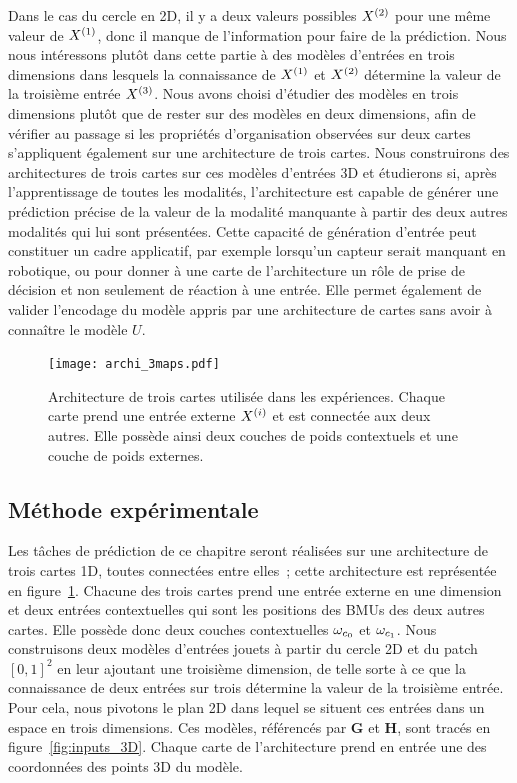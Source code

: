\documentclass[../main]{subfiles}
\begin{document}
Dans le cas du cercle en 2D, il y a deux valeurs possibles $X^{({2})}$ pour une même valeur de $X^{({1})}$, donc il manque de l'information pour faire de la prédiction.
Nous nous intéressons plutôt dans cette partie à des modèles d'entrées en trois dimensions dans lesquels la connaissance de $X^{({1})}$ et $X^{({2})}$ détermine la valeur de la troisième entrée $X^{({3})}$.
Nous avons choisi d'étudier des modèles en trois dimensions plutôt que de rester sur des modèles en deux dimensions, afin de vérifier au passage si les propriétés d'organisation observées sur deux cartes s'appliquent également sur une architecture de trois cartes.
Nous construirons des architectures de trois cartes sur ces modèles d'entrées 3D et étudierons si, après l'apprentissage de toutes les modalités, l'architecture est capable de générer une prédiction précise de la valeur de la modalité manquante à partir des deux autres modalités qui lui sont présentées.
Cette capacité de génération d'entrée peut constituer un cadre applicatif, par exemple lorsqu'un capteur serait manquant en robotique, ou pour donner à une carte de l'architecture un rôle de prise de décision et non seulement de réaction à une entrée.
Elle permet également de valider l'encodage du modèle appris par une architecture de cartes sans avoir à connaître le modèle $U$.


\begin{figure}[H]
	\centering\texttt{[image: archi\_3maps.pdf]}
	\vspace{-0.5cm}
	\caption{Architecture de trois cartes utilisée dans les expériences. Chaque carte prend une entrée externe $X^{({i})}$ et est connectée aux deux autres. Elle possède ainsi deux couches de poids contextuels et une couche de poids externes.\label{fig:archi_3maps}}
\end{figure}

\subsection{Méthode expérimentale}

Les tâches de prédiction de ce chapitre seront réalisées sur une architecture de trois cartes 1D, toutes connectées entre elles~; cette architecture est représentée en figure~\ref{fig:archi_3maps}.
Chacune des trois cartes prend une entrée externe en une dimension et deux entrées contextuelles qui sont les positions des BMUs des deux autres cartes. Elle possède donc deux couches contextuelles $\omega_{c_0}$ et $\omega_{c_1}$.
Nous construisons deux modèles d'entrées jouets à partir du cercle 2D et du patch $[0,1]^2$ en leur ajoutant une troisième dimension, de telle sorte à ce que la connaissance de deux entrées sur trois détermine la valeur de la troisième entrée. Pour cela, nous pivotons le plan 2D dans lequel se situent ces entrées dans un espace en trois dimensions.
Ces modèles, référencés par \textbf{G} et \textbf{H}, sont tracés en figure~\ref{fig:inputs_3D}.
Chaque carte de l'architecture prend en entrée une des coordonnées des points 3D du modèle.
\end{document}
